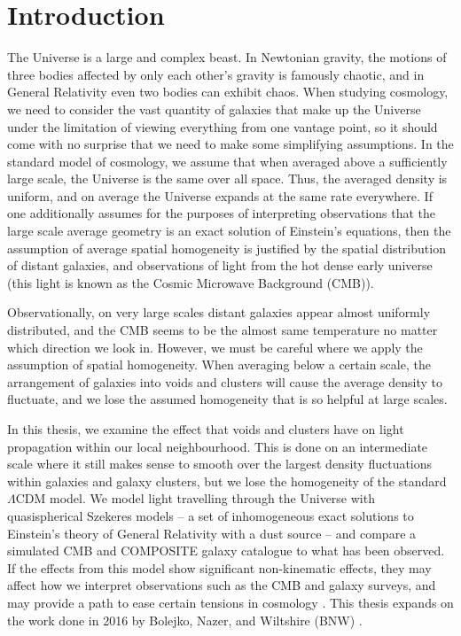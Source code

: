 \documentclass[a4paper,12pt]{report}
\begin{document}
\chapter{Introduction}
\setcounter{page}{1}
\label{intro}
The Universe is a large and complex beast. In Newtonian gravity, the motions of three bodies affected by only each other's gravity is famously chaotic, and in General Relativity even two bodies can exhibit chaos. When studying cosmology, we need to consider the vast quantity of galaxies that make up the Universe under the limitation of viewing everything from one vantage point, so it should come with no surprise that we need to make some simplifying assumptions. In the standard model of cosmology, we assume that when averaged above a sufficiently large scale, the Universe is the same over all space. Thus, the averaged density is uniform, and on average the Universe expands at the same rate everywhere.
If one additionally assumes for the purposes of interpreting observations that the large scale average geometry is an exact solution of Einstein's equations, then the assumption of average spatial homogeneity is justified by the spatial distribution of distant galaxies, and observations of light from the hot dense early universe (this light is known as the Cosmic Microwave Background (CMB)).

Observationally, on very large scales distant galaxies appear almost uniformly distributed, and the CMB seems to be the almost same temperature no matter which direction we look in. However, we must be careful where we apply the assumption of spatial homogeneity. When averaging below a certain scale, the arrangement of galaxies into voids and clusters will cause the average density to fluctuate, and we lose the assumed homogeneity that is so helpful at large scales.

In this thesis, we examine the effect that voids and clusters have on light propagation within our local neighbourhood. This is done on an intermediate scale where it still makes sense to smooth over the largest density fluctuations within galaxies and galaxy clusters, but we lose the homogeneity of the standard $\Lambda$CDM model. We model light travelling through the Universe with quasispherical Szekeres models -- a set of inhomogeneous exact solutions to Einstein's theory of General Relativity with a dust source -- and compare a simulated CMB and COMPOSITE galaxy catalogue \cite{RN82,RN183} to what has been observed. If the effects from this model show significant non-kinematic effects, they may affect how we interpret observations such as the CMB and galaxy surveys, and may provide a path to ease certain tensions in cosmology \cite{RN35}. This thesis expands on the work done in 2016 by Bolejko, Nazer, and Wiltshire (BNW) \cite{RN3}.
\end{document}
